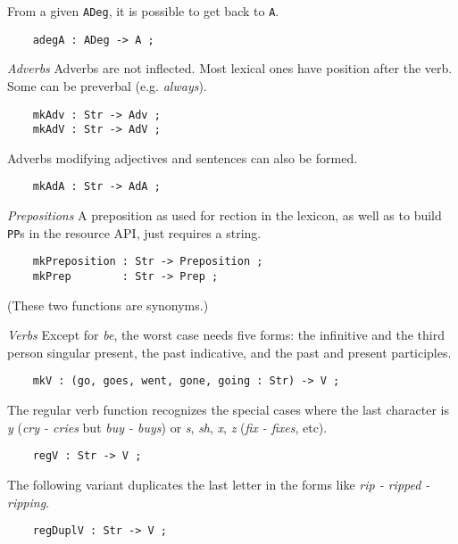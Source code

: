 \documentclass[11pt,a4paper]{article}
\newcommand{\subsubsubsection}[1]{\textit{#1}}
\begin{document}
From a given \texttt{ADeg}, it is possible to get back to \texttt{A}.

\begin{verbatim}
    adegA : ADeg -> A ;
\end{verbatim}

\subsubsubsection{Adverbs}
Adverbs are not inflected. Most lexical ones have position
after the verb. Some can be preverbal (e.g. \textit{always}).

\begin{verbatim}
    mkAdv : Str -> Adv ;
    mkAdV : Str -> AdV ;
\end{verbatim}

Adverbs modifying adjectives and sentences can also be formed.

\begin{verbatim}
    mkAdA : Str -> AdA ;
\end{verbatim}

\subsubsubsection{Prepositions}
A preposition as used for rection in the lexicon, as well as to
build \texttt{PP}s in the resource API, just requires a string.

\begin{verbatim}
    mkPreposition : Str -> Preposition ;
    mkPrep        : Str -> Prep ;
\end{verbatim}

(These two functions are synonyms.)

\subsubsubsection{Verbs}
Except for \textit{be}, the worst case needs five forms: the infinitive and
the third person singular present, the past indicative, and the
past and present participles.

\begin{verbatim}
    mkV : (go, goes, went, gone, going : Str) -> V ;
\end{verbatim}

The regular verb function recognizes the special cases where the last
character is \textit{y} (\textit{cry - cries} but \textit{buy - buys}) or \textit{s}, \textit{sh}, \textit{x}, \textit{z}
(\textit{fix - fixes}, etc).

\begin{verbatim}
    regV : Str -> V ;
\end{verbatim}

The following variant duplicates the last letter in the forms like
\textit{rip - ripped - ripping}.

\begin{verbatim}
    regDuplV : Str -> V ;
\end{verbatim}
\end{document}

